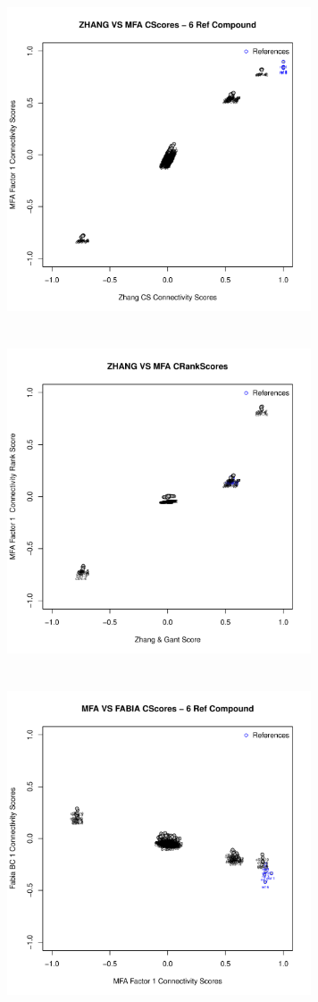 \documentclass[a4paper]{article}\usepackage[]{graphicx}\usepackage[]{color}
\newenvironment{knitrout}{}{} %
\begin{document}
\begin{knitrout}
\begin{figure}[H]
\includegraphics[width=9cm,height=10cm]{figure/CScompare-1} 
\includegraphics[width=9cm,height=10cm]{figure/CScompare-2} 
\includegraphics[width=9cm,height=10cm]{figure/CScompare-3} 

\end{figure}
\end{knitrout}
\end{document}
